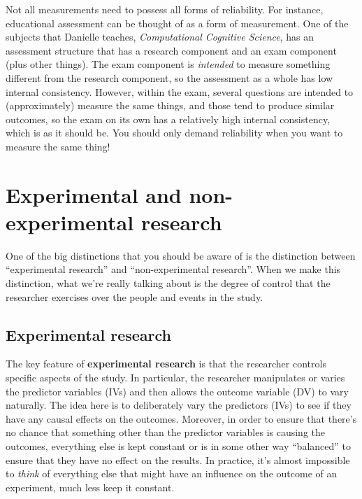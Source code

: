 \documentclass[
  11pt,
]{book}
\theoremstyle{definition}
\theoremstyle{definition}
\theoremstyle{definition}
\theoremstyle{definition}
\theoremstyle{remark}
\begin{document}
Not all measurements need to possess all forms of reliability. For instance, educational assessment can be thought of as a form of measurement. One of the subjects that Danielle teaches, \emph{Computational Cognitive Science}, has an assessment structure that has a research component and an exam component (plus other things). The exam component is \emph{intended} to measure something different from the research component, so the assessment as a whole has low internal consistency. However, within the exam, several questions are intended to (approximately) measure the same things, and those tend to produce similar outcomes, so the exam on its own has a relatively high internal consistency, which is as it should be. You should only demand reliability when you want to measure the same thing!

\hypertarget{researchdesigns}{%
\section{Experimental and non-experimental research}\label{researchdesigns}}

One of the big distinctions that you should be aware of is the distinction between ``experimental research'' and ``non-experimental research''. When we make this distinction, what we're really talking about is the degree of control that the researcher exercises over the people and events in the study.

\hypertarget{experimental-research}{%
\subsection{Experimental research}\label{experimental-research}}

The key feature of \textbf{experimental research} is that the researcher controls specific aspects of the study. In particular, the researcher manipulates or varies the predictor variables (IVs) and then allows the outcome variable (DV) to vary naturally. The idea here is to deliberately vary the predictors (IVs) to see if they have any causal effects on the outcomes. Moreover, in order to ensure that there's no chance that something other than the predictor variables is causing the outcomes, everything else is kept constant or is in some other way ``balanced'' to ensure that they have no effect on the results. In practice, it's almost impossible to \emph{think} of everything else that might have an influence on the outcome of an experiment, much less keep it constant.
\end{document}

